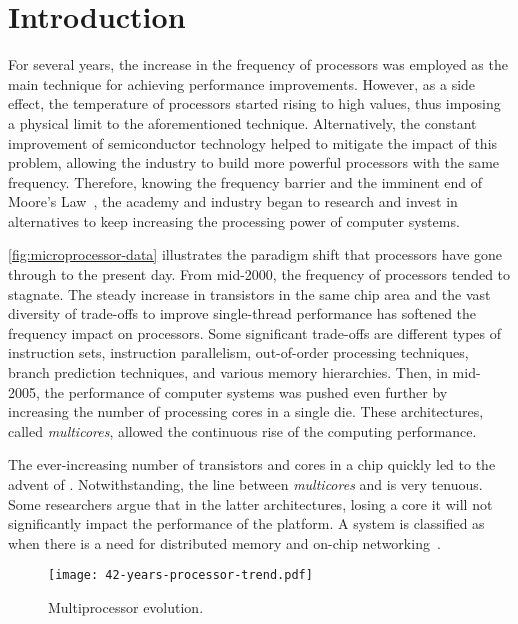 \chapter{Introduction}
\label{ch.intro}

	For several years, the increase in the frequency of processors was
	employed as the main technique for achieving performance
	improvements. However, as a side effect, the temperature of
	processors started rising to high values, thus imposing a physical
	limit to the aforementioned technique. Alternatively, the constant
	improvement of semiconductor technology helped to mitigate the
	impact of this problem, allowing the industry to build more powerful
	processors with the same frequency. Therefore, knowing the
	frequency barrier and the imminent end of Moore's
	Law~\cite{moore:1965}, the academy and industry began to research
	and invest in alternatives to keep increasing the processing power
	of computer systems.

	\autoref{fig:microprocessor-data} illustrates the paradigm shift
	that processors have gone through to the present day. From mid-2000,
	the frequency of processors tended to stagnate. The steady increase
	in transistors in the same chip area and the vast diversity of
	trade-offs to improve single-thread performance has softened the
	frequency impact on processors. Some significant trade-offs are
	different types of instruction sets, instruction parallelism,
	out-of-order processing techniques, branch prediction techniques,
	and various memory hierarchies. Then, in mid-2005, the performance
	of computer systems was pushed even further by increasing the number
	of processing cores in a single die. These architectures, called
	\textit{multicores}, allowed the continuous rise of the computing
	performance.

	The ever-increasing number of transistors and cores in a chip
	quickly led to the advent of \manycores. Notwithstanding, the line
	between \textit{multicores} and \manycores is very tenuous. Some
	researchers argue that in the latter architectures, losing a core it
	will not significantly impact the performance of the platform. A
	system is classified as \manycore when there is a need for
	distributed memory and on-chip networking~\cite{freitas:thesis}.

	\begin{figure}[t]
		\centering%
		\caption{Multiprocessor evolution.}%
		\label{fig:microprocessor-data}%
		\texttt{[image: 42-years-processor-trend.pdf]}%
	\end{figure}

